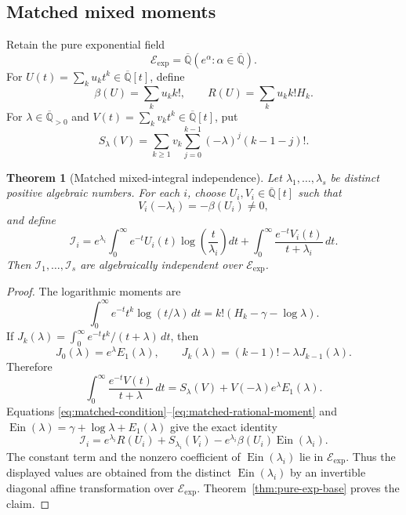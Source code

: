 \documentclass[11pt]{article}
\newtheorem{theorem}{Theorem}[section]
\theoremstyle{definition}
\theoremstyle{remark}
\newcommand{\Qbar}{\overline{\mathbb Q}}
\newcommand{\Ein}{\operatorname{Ein}}
\newcommand{\Eexp}{\mathcal E_{\mathrm{exp}}}
\begin{document}
\subsection{Matched mixed moments}

Retain the pure exponential field
\[
 \Eexp=\Qbar(e^\alpha:\alpha\in\Qbar).
\]
For \(U(t)=\sum_ku_kt^k\in\Qbar[t]\), define
\begin{equation}\label{eq:matched-beta-r}
 \beta(U)=\sum_ku_kk!,
 \qquad
 R(U)=\sum_ku_kk!H_k.
\end{equation}
For \(\lambda\in\Qbar_{>0}\) and
\(V(t)=\sum_kv_kt^k\in\Qbar[t]\), put
\begin{equation}\label{eq:matched-s}
 S_\lambda(V)=
 \sum_{k\geq1}v_k\sum_{j=0}^{k-1}
 (-\lambda)^j(k-1-j)!.
\end{equation}

\begin{theorem}[Matched mixed-integral independence]
\label{thm:matched-mixed-integrals}
Let \(\lambda_1,\ldots,\lambda_s\) be distinct positive algebraic numbers.
For each \(i\), choose \(U_i,V_i\in\Qbar[t]\) such that
\begin{equation}\label{eq:matched-condition}
 V_i(-\lambda_i)=-\beta(U_i)\ne0,
\end{equation}
and define
\begin{equation}\label{eq:matched-integral}
 \mathscr I_i=
 e^{\lambda_i}\int_0^\infty e^{-t}U_i(t)
       \log\!\left(\frac{t}{\lambda_i}\right)dt
 +\int_0^\infty\frac{e^{-t}V_i(t)}{t+\lambda_i}\,dt.
\end{equation}
Then \(\mathscr I_1,\ldots,\mathscr I_s\) are algebraically independent
over \(\Eexp\).
\end{theorem}

\begin{proof}
The logarithmic moments are
\begin{equation}\label{eq:matched-log-moment}
 \int_0^\infty e^{-t}t^k\log(t/\lambda)\,dt
 =k!(H_k-\gamma-\log\lambda).
\end{equation}
If
\(J_k(\lambda)=\int_0^\infty e^{-t}t^k/(t+\lambda)\,dt\), then
\[
 J_0(\lambda)=e^\lambda E_1(\lambda),
 \qquad
 J_k(\lambda)=(k-1)!-\lambda J_{k-1}(\lambda).
\]
Therefore
\begin{equation}\label{eq:matched-rational-moment}
 \int_0^\infty\frac{e^{-t}V(t)}{t+\lambda}\,dt
 =S_\lambda(V)+V(-\lambda)e^\lambda E_1(\lambda).
\end{equation}
Equations \eqref{eq:matched-condition}--\eqref{eq:matched-rational-moment}
and
\(\Ein(\lambda)=\gamma+\log\lambda+E_1(\lambda)\) give the exact identity
\begin{equation}\label{eq:matched-affine-ein}
 \boxed{
 \mathscr I_i=e^{\lambda_i}R(U_i)+S_{\lambda_i}(V_i)
 -e^{\lambda_i}\beta(U_i)\Ein(\lambda_i).}
\end{equation}
The constant term and the nonzero coefficient of \(\Ein(\lambda_i)\) lie
in \(\Eexp\).  Thus the displayed values are obtained from the distinct
\(\Ein(\lambda_i)\) by an invertible diagonal affine transformation over
\(\Eexp\).  Theorem~\ref{thm:pure-exp-base} proves the claim.
\end{proof}
\end{document}
